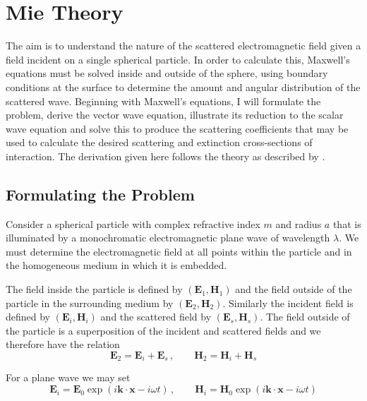 \appendix %
\chapter{Mie Theory}\label{append:appendA}
The aim is to understand the nature of the scattered electromagnetic field given a field incident on a single spherical particle.  In order to calculate this, Maxwell's equations must be solved inside and outside of the sphere, using boundary conditions at the surface to determine the amount and angular distribution of the scattered wave.  Beginning with Maxwell's equations, I will formulate the problem, derive the vector wave equation, illustrate its reduction to the scalar wave equation and solve this to produce the scattering coefficients that may be used to calculate the desired scattering and extinction cross-sections of interaction. The derivation given here follows the theory as described by \citet{Bohren1983}.

\section{Formulating the Problem}

Consider a spherical particle with complex refractive index $m$ and radius $a$ that is illuminated by a monochromatic electromagnetic plane wave of wavelength $\lambda$.  We must determine the electromagnetic field at all points within the particle and in the homogeneous medium in which it is embedded.

The field inside the particle is defined by $(\mathbf{E}_1,\mathbf{H}_1)$ and the field outside of the particle in the surrounding medium by $(\mathbf{E}_2,\mathbf{H}_2)$.  Similarly the incident field is defined by $(\mathbf{E}_i,\mathbf{H}_i)$ and the scattered field by $(\mathbf{E}_s,\mathbf{H}_s)$.  The field outside of the particle is a superposition of the incident and scattered fields and we therefore have the relation
\begin{equation}
\mathbf{E}_2=\mathbf{E}_i+\mathbf{E}_s\,, \quad \quad \mathbf{H}_2=\mathbf{H}_i+\mathbf{H}_s
\end{equation}

\noindent For a plane wave we may set
\begin{equation}
\mathbf{E}_i=\mathbf{E}_0 \exp (i \mathbf{k}\cdot\mathbf{x}-i\omega t) \, , \quad \quad \mathbf{H}_i=\mathbf{H}_0 \exp (i \mathbf{k}\cdot\mathbf{x}-i\omega t)
\end{equation}

